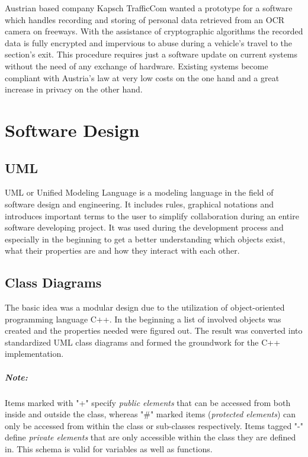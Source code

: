 \documentclass[oneside,bachelor,etd]{BYUPhys}
\begin{document}
Austrian based company Kapsch TrafficCom wanted a prototype for a software which handles recording and storing of personal data
retrieved from an OCR camera on freeways. With the assistance of cryptographic algorithms the recorded data is fully encrypted and impervious to abuse 
during a vehicle's travel to the section's exit. This procedure requires just a software update on current systems without 
the need of any exchange of hardware. Existing systems become compliant with Austria's law at very low costs on the one hand and 
a great increase in privacy on the other hand. 


\chapter{Software Design}
\section{UML}
\label{sec:2uml}

UML or Unified Modeling Language is a modeling language in the field of software design and engineering. 
It includes rules, graphical notations and introduces important terms to the user to simplify collaboration during
an entire software developing project. It was used during the development process and especially in the beginning
to get a better understanding which objects exist, what their properties are and how they interact with each other.


\section{Class Diagrams}
\label{sec:2classdiagrams}

The basic idea was a modular design due to the utilization of object-oriented programming language C++.
In the beginning a list of involved objects was created and the properties needed were figured out. The result
was converted into standardized UML class diagrams and formed the groundwork for the C++ implementation.

\paragraph{Note:} Items marked with "+" specify \textit{public elements} that can be accessed  from both inside and outside
the class, whereas "\#" marked items (\textit{protected elements}) can only be accessed from within the class or sub-classes respectively.
Items tagged "-" define \textit{private elements} that are only accessible within the class they are defined in.
This schema is valid for variables as well as functions.
\end{document}
